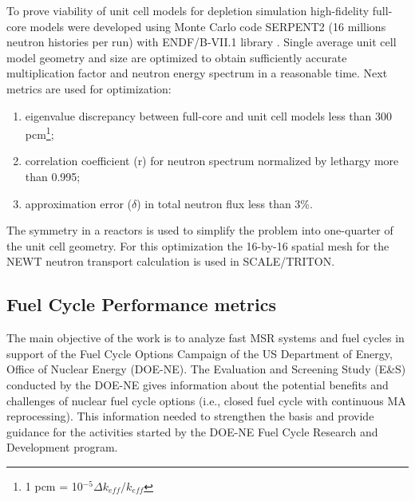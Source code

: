 \documentclass{anstrans}
\begin{document}
To prove viability of unit cell models for depletion simulation high-fidelity full-core models were developed using Monte Carlo code SERPENT2 (16 millions neutron histories per run) with ENDF/B-VII.1 library \cite{leppanen_serpent_2015, chadwick_endf/b-vii.1_2011}. Single average unit cell model geometry and size are optimized to obtain sufficiently accurate multiplication factor and neutron energy spectrum in a reasonable time. Next metrics are used for optimization:
\vspace{-0.06in}
\begin{enumerate}
	\item eigenvalue discrepancy between full-core and unit cell models less than 300 pcm\footnote{ 1 pcm = 10$^{-5}\Delta k_{eff}/k_{eff}$};\vspace{-0.07in}
	\item correlation coefficient (r) for neutron spectrum normalized by lethargy more than 0.995;\vspace{-0.07in}
	\item approximation error ($\delta$) in total neutron flux less than 3\%.\vspace{-0.06in}
\end{enumerate}
The symmetry in a reactors is used to simplify the problem into one-quarter of the unit cell geometry. For this optimization the 16-by-16 spatial mesh for the NEWT neutron transport calculation is used in SCALE/TRITON.

\subsection{Fuel Cycle Performance metrics} 
\label{sec:metrics}
The main objective of the work is to analyze fast \gls{MSR} systems and fuel cycles in support of the Fuel Cycle Options Campaign of the US Department of Energy, Office of Nuclear Energy (DOE-NE). The Evaluation and Screening Study (E\&S) conducted by the DOE-NE gives information about the potential benefits and challenges of nuclear fuel cycle options (i.e., closed fuel cycle with continuous \gls{MA} reprocessing). This information needed to strengthen the basis and provide guidance for the activities started by the DOE-NE Fuel Cycle Research and Development program.
\end{document}

